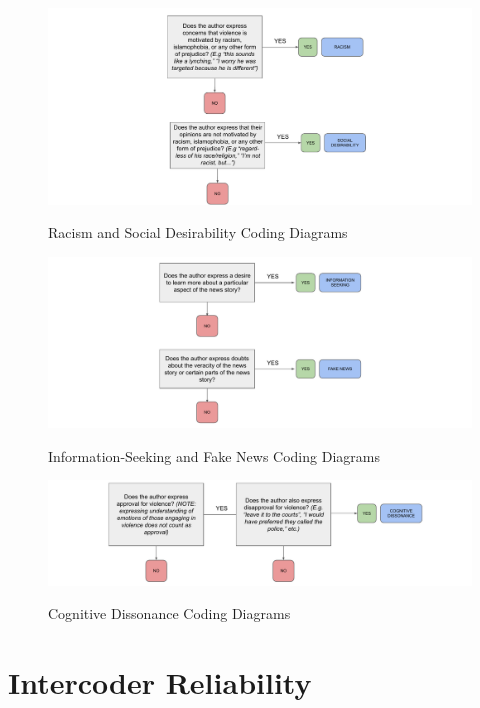 \documentclass[]{article}
\begin{document}

\begin{figure}[H]
  \centering
  \caption{Racism and Social Desirability Coding Diagrams}
  \vspace{1em}
  \includegraphics[width=.94\textwidth]{figures/RacismSocialDesirability.pdf}\\
\end{figure}

\begin{figure}[H]
  \centering
  \caption{Information-Seeking and Fake News Coding Diagrams}
  \vspace{1em}
  \includegraphics[width=.94\textwidth]{figures/InfoSeekingFakeNews.pdf}\\
\end{figure}

\begin{figure}[H]
  \centering
  \caption{Cognitive Dissonance Coding Diagrams}
  \vspace{1em}
  \includegraphics[width=.94\textwidth]{figures/CognitiveDissonance.pdf}\\
\end{figure}

\section{Intercoder Reliability}


\end{document}
